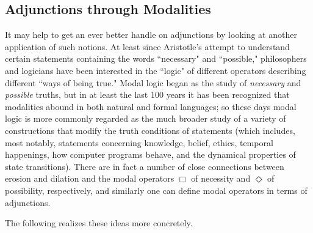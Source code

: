 \documentclass[11pt]{book}
\theoremstyle{definition}
\theoremstyle{definition}
\theoremstyle{definition}
\theoremstyle{theorem}
\theoremstyle{definition}
\begin{document}
\subsection{Adjunctions through Modalities}\label{section: modalities}
It may help to get an ever better handle on adjunctions by looking at another application of such notions. At least since Aristotle's attempt to understand certain statements containing the words ``necessary" and ``possible," philosophers and logicians have been interested in the ``logic" of different operators describing different ``ways of being true." Modal logic began as the study of \textit{necessary} and \textit{possible} truths, but in at least the last 100 years it has been recognized that modalities abound in both natural and formal languages; so these days modal logic is more commonly regarded as the much broader study of a variety of constructions that modify the truth conditions of statements (which includes, most notably, statements concerning knowledge, belief, ethics, temporal happenings, how computer programs behave, and the dynamical properties of state transitions). There are in fact a number of close connections between erosion and dilation and the modal operators $\Box$ of necessity and $\Diamond$ of possibility, respectively, and similarly one can define modal operators in terms of adjunctions. \par 
The following realizes these ideas more concretely. 
\end{document}
